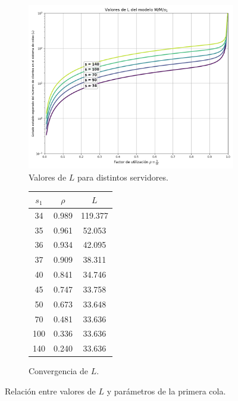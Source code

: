 \documentclass[10pt]{article}
\begin{document}
    \begin{figure}[!ht]
    	\centering
    	
    	\begin{subfigure}[c]{0.65\textwidth}
    		\centering
    		\includegraphics[width=\textwidth]{./images/rho-l-s1.png}
    		\caption{Valores de $L$ para distintos servidores.}
    		\label{fig:valores_s1}
    	\end{subfigure}
    	\begin{subfigure}[c]{0.3\textwidth}
    		\centering
    		\label{s1_comp}
    		\begin{tabular}{|c|c|c|}
    			\hline
    			$s_{1}$ & $\rho$ & $L$ \\
    			\hline
    			34 & 0.989 & 119.377 \\
    			35 & 0.961 & 52.053 \\
    			36 & 0.934 & 42.095 \\
    			37 & 0.909 & 38.311 \\
    			40 & 0.841 & 34.746 \\
    			45 & 0.747 & 33.758 \\
    			50 & 0.673 & 33.648 \\
    			70 & 0.481 & 33.636 \\
    			100 & 0.336 & 33.636 \\
    			140 & 0.240 & 33.636 \\
    			\hline
    		\end{tabular}
    		\caption{Convergencia de $L$.}
    		\label{tab:s1_comp}
    	\end{subfigure}
    	\caption{Relación entre valores de $L$ y parámetros de la primera cola.}
    	\label{fig:analisis_s1}
    \end{figure}
    
\end{document}
